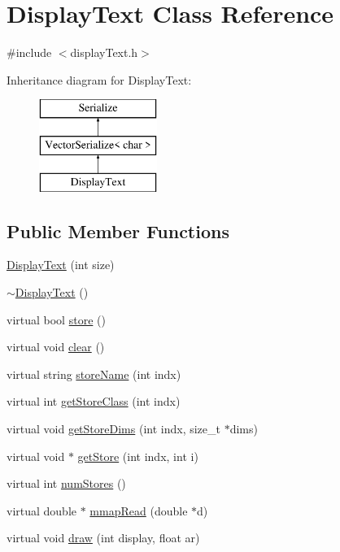 \hypertarget{classDisplayText}{\section{Display\-Text Class Reference}
\label{classDisplayText}
}


{\ttfamily \#include $<$display\-Text.\-h$>$}

Inheritance diagram for Display\-Text\-:\begin{figure}[H]
\begin{center}
\leavevmode
\includegraphics[height=3.000000cm]{classDisplayText}
\end{center}
\end{figure}
\subsection*{Public Member Functions}
\begin{DoxyCompactItemize}
\item 
\hyperlink{classDisplayText_a998e42cd6bab6ab04556b50f89b5209b}{Display\-Text} (int size)
\item 
\hyperlink{classDisplayText_a67c96d3dc8538032470131d4988b42bb}{$\sim$\-Display\-Text} ()
\item 
virtual bool \hyperlink{classDisplayText_a16d096c25b729eabfce141eb7dcf9012}{store} ()
\item 
virtual void \hyperlink{classDisplayText_a0c7a7a5200482ea4817f6c550dc7dea9}{clear} ()
\item 
virtual string \hyperlink{classDisplayText_af663118f6d5010d2d1d45f2bf3680dfc}{store\-Name} (int indx)
\item 
virtual int \hyperlink{classDisplayText_aaa8ccb67b152d79505e5acc8448770ed}{get\-Store\-Class} (int indx)
\item 
virtual void \hyperlink{classDisplayText_a81a37dd4e0fa54265843db620c371d02}{get\-Store\-Dims} (int indx, size\-\_\-t $\ast$dims)
\item 
virtual void $\ast$ \hyperlink{classDisplayText_aea5003c9c461955ec3c9a3a4b4fc2c25}{get\-Store} (int indx, int i)
\item 
virtual int \hyperlink{classDisplayText_a06b49281616900153577f7c731e4bd62}{num\-Stores} ()
\item 
virtual double $\ast$ \hyperlink{classDisplayText_ae5f08045997631736d8400ad3662fe5b}{mmap\-Read} (double $\ast$d)
\item 
virtual void \hyperlink{classDisplayText_a1eddd0c9f33244eb10540c51aa1dbfda}{draw} (int display, float ar)
\end{DoxyCompactItemize}
